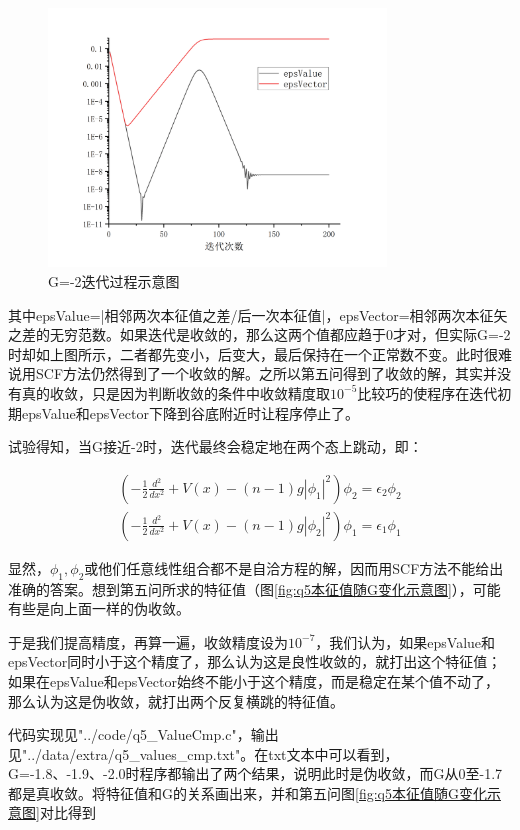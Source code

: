 \documentclass[10pt, a4paper]{article}
\begin{document}
    \begin{figure}[H]
      \centering
      \includegraphics[width=0.8\textwidth]{G=-2迭代过程示意图.jpg}
      \caption{G=-2迭代过程示意图}\label{fig:G=-2迭代过程示意图}
    \end{figure}

    其中epsValue=|相邻两次本征值之差/后一次本征值|，epsVector=相邻两次本征矢之差的无穷范数。如果迭代是收敛的，那么这两个值都应趋于0才对，但实际G=-2时却如上图所示，二者都先变小，后变大，最后保持在一个正常数不变。此时很难说用SCF方法仍然得到了一个收敛的解。之所以第五问得到了收敛的解，其实并没有真的收敛，只是因为判断收敛的条件中收敛精度取$10^{-5}$比较巧的使程序在迭代初期epsValue和epsVector下降到谷底附近时让程序停止了。

    试验得知，当G接近-2时，迭代最终会稳定地在两个态上跳动，即：

    \begin{align*}
      (-\frac{1}{2}\frac{d^2}{dx^2}+V(x)-{(n-1)}g|\phi_1|^2)\phi_2=\epsilon_2 \phi_2\\
      (-\frac{1}{2}\frac{d^2}{dx^2}+V(x)-{(n-1)}g|\phi_2|^2)\phi_1=\epsilon_1 \phi_1
    \end{align*}

    显然，$\phi_1,\phi_2$或他们任意线性组合都不是自洽方程的解，因而用SCF方法不能给出准确的答案。想到第五问所求的特征值（图\ref{fig:q5本征值随G变化示意图}），可能有些是向上面一样的伪收敛。

    于是我们提高精度，再算一遍，收敛精度设为$10^{-7}$，我们认为，如果epsValue和epsVector同时小于这个精度了，那么认为这是良性收敛的，就打出这个特征值；如果在epsValue和epsVector始终不能小于这个精度，而是稳定在某个值不动了，那么认为这是伪收敛，就打出两个反复横跳的特征值。

    代码实现见"../code/q5_ValueCmp.c"，输出见"../data/extra/q5_values_cmp.txt"。在txt文本中可以看到，G=-1.8、-1.9、-2.0时程序都输出了两个结果，说明此时是伪收敛，而G从0至-1.7都是真收敛。将特征值和G的关系画出来，并和第五问图\ref{fig:q5本征值随G变化示意图}对比得到
\end{document}
